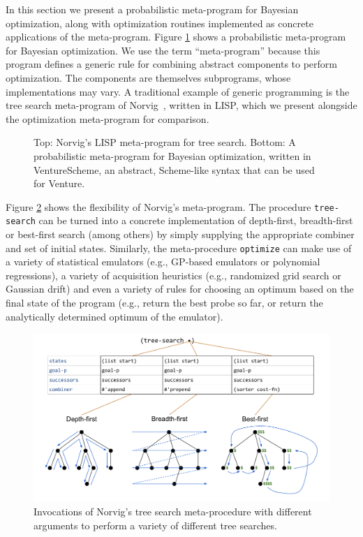 In this section we present a probabilistic meta-program for Bayesian
optimization, along with optimization routines implemented as concrete
applications of the meta-program.  Figure \ref{fig:slide3-definitions} shows a probabilistic meta-program for
Bayesian optimization.  We use the term ``meta-program'' because this program
defines a generic rule for combining abstract components to perform
optimization.  The components are themselves subprograms, whose implementations
may vary.  A traditional example of generic programming is the tree search
meta-program of Norvig~\cite{norvig1992paradigms}, written in LISP, which we present
alongside the optimization meta-program for comparison.

\begin{figure}[p]
  \begin{minipage}{\linewidth}
    
    
  \end{minipage}
  \caption{
    Top: Norvig's LISP meta-program for tree search.
    Bottom: A probabilistic meta-program for Bayesian optimization, written in
    VentureScheme, an abstract, Scheme-like syntax that can be used for Venture.
  }
  \label{fig:slide3-definitions}
\end{figure}

Figure \ref{fig:slide3-tree-search} shows the flexibility of Norvig's
meta-program.  The procedure \texttt{tree-search} can be turned into a concrete
implementation of depth-first, breadth-first or best-first search (among others)
by simply supplying the appropriate combiner and set of initial states.
Similarly, the meta-procedure \texttt{optimize} can make use of a variety of
statistical emulators (e.g., GP-based emulators or polynomial regressions), a
variety of acquisition heuristics (e.g., randomized grid search or Gaussian
drift) and even a variety of rules for choosing an optimum based on the final
state of the program (e.g., return the best probe so far, or return the
analytically determined optimum of the emulator). 

\begin{figure}
  \centering
  \includegraphics[width=\linewidth]{figs/slide3_treesearch.pdf}
  \caption{
    Invocations of Norvig's tree search meta-procedure with different arguments
    to perform a variety of different tree searches.
  }
  \label{fig:slide3-tree-search}
\end{figure}


